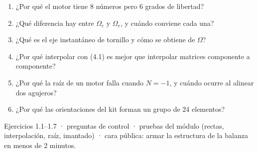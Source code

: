\documentclass[11pt,a4paper]{article}
\begin{document}
\begin{control}
\begin{enumerate}[leftmargin=*]
  \item ¿Por qué el motor tiene 8 números pero 6 grados de libertad?
  \item ¿Qué diferencia hay entre $\Omega_c$ y $\Omega_e$, y cuándo conviene cada una?
  \item ¿Qué es el eje instantáneo de tornillo y cómo se obtiene de $\Omega$?
  \item ¿Por qué interpolar con (4.1) es mejor que interpolar matrices componente a componente?
  \item ¿Por qué la raíz de un motor falla cuando $N = -1$, y cuándo ocurre al alinear dos agujeros?
  \item ¿Por qué las orientaciones del kit forman un grupo de 24 elementos?
\end{enumerate}
\end{control}

\begin{cierre}
Ejercicios 1.1--1.7 · preguntas de control · pruebas del módulo (rectas, interpolación, raíz, imantado) · cara
pública: armar la estructura de la balanza en menos de 2 minutos.
\end{cierre}
\end{document}
